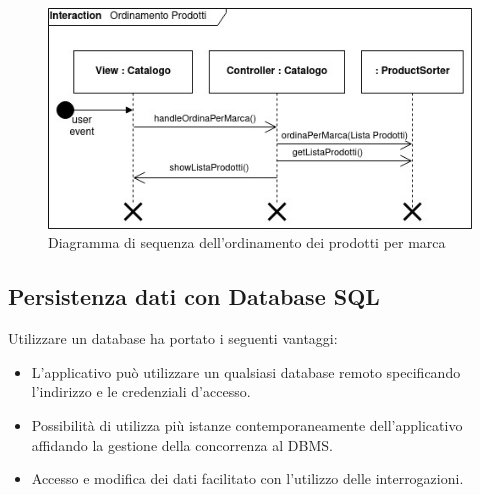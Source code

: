 \documentclass{article}
\begin{document}
\begin{figure}[h!]
	\centering
	\includegraphics[width=\textwidth]{SDSorting.jpg}
	\caption{Diagramma di sequenza dell'ordinamento dei prodotti per marca}
	\label{fig:SDSorting}
\end{figure}

\clearpage
\subsection{Persistenza dati con Database SQL}
Utilizzare un database ha portato i seguenti vantaggi:
\begin{itemize}
	\item{
	      L'applicativo può utilizzare un qualsiasi database remoto specificando l'indirizzo e le credenziali d'accesso.}

	\item{
	      Possibilità di utilizza più istanze contemporaneamente dell'applicativo affidando la gestione
	      della concorrenza al DBMS.}
	\item{
	      Accesso e modifica dei dati facilitato con l'utilizzo delle interrogazioni.}
\end{itemize}
\end{document}
